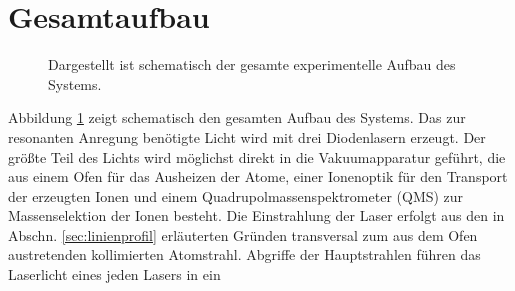 \section{Gesamtaufbau}\label{sec:gesamtaufbau}
\begin{figure}[h]
 	\centering
	\caption[Gesamter experimenteller Aufbau, schematisch]{Dargestellt ist
	schematisch der gesamte experimentelle Aufbau des Systems.}\label{fig:experimenteller_aufbau_gesamt}
\end{figure}
Abbildung \ref{fig:experimenteller_aufbau_gesamt} zeigt schematisch den gesamten
Aufbau des Systems. Das zur resonanten Anregung benötigte Licht wird mit drei
Diodenlasern erzeugt. Der größte Teil des Lichts wird möglichst
direkt in die Vakuumapparatur geführt, die aus einem Ofen für das Ausheizen der
Atome, einer Ionenoptik für den Transport der erzeugten Ionen und einem
Quadrupolmassenspektrometer (QMS) zur Massenselektion der Ionen besteht.
Die Einstrahlung der Laser erfolgt aus den in Abschn. \ref{sec:linienprofil}
erläuterten Gründen transversal zum aus dem Ofen austretenden kollimierten Atomstrahl.
Abgriffe der Hauptstrahlen führen das Laserlicht eines jeden Lasers in ein

